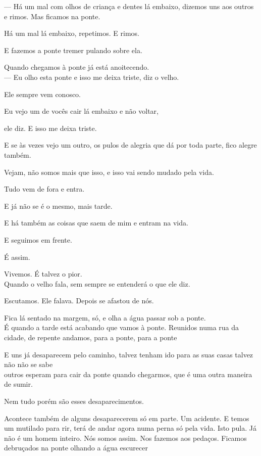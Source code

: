 --- Há um mal com olhos de criança e dentes lá embaixo, dizemos uns aos
outros e rimos. Mas ficamos na ponte.

Há um mal lá embaixo, repetimos. E rimos.

E fazemos a ponte tremer pulando sobre ela.

Quando chegamos à ponte já está anoitecendo.\\

--- Eu olho esta ponte e isso me deixa triste, diz o velho.

Ele sempre vem conosco.

Eu vejo um de vocês cair lá embaixo e não voltar,

ele diz. E isso me deixa triste.

E se às vezes vejo um outro, os pulos de alegria que dá por toda parte,
fico alegre também.

Vejam, não somos mais que isso, e isso vai sendo mudado pela vida.

Tudo vem de fora e entra.

E já não se é o mesmo, mais tarde.

E há também as coisas que saem de mim e entram na vida.

E seguimos em frente.

É assim.

Vivemos. É talvez o pior.\\

Quando o velho fala, sem sempre se entenderá o que ele diz.

Escutamos. Ele falava. Depois se afastou de nós.

Fica lá sentado na margem, só, e olha a água passar sob a ponte.\\

É quando a tarde está acabando que vamos à ponte. Reunidos numa rua da
cidade, de repente andamos, para a ponte, para a ponte

E uns já desaparecem pelo caminho, talvez tenham ido para as suas casas
talvez não não se sabe\\

outros esperam para cair da ponte quando chegarmos, que é uma outra
maneira de sumir.

Nem tudo porém são esses desaparecimentos.

Acontece também de alguns desaparecerem só em parte. Um acidente. E
temos um mutilado para rir, terá de andar agora numa perna só pela vida.
Isto pula. Já não é um homem inteiro. Nós somos assim. Nos fazemos aos
pedaços. Ficamos debruçados na ponte olhando a água escurecer\\

